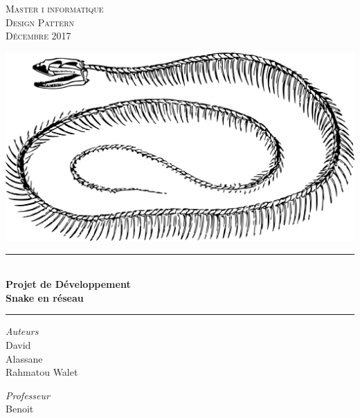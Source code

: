 \documentclass{report}
\begin{document}
\begin{titlepage}
	\centering
	
    \vspace*{1.2 cm}
    
   	\textsc{\LARGE Master i informatique\\Design Pattern\\[0.3cm]\large Décembre 2017}

	\vspace{2.2cm}
    
    
    \includegraphics[scale = 0.29]{img/snake.png}\\[0.5 cm]
	\rule{\linewidth }{0.2 mm} \\[0.15 cm]
    {\LARGE \textbf{Projet de Développement}\\[0.2cm] \large
		\textbf{Snake en réseau}}\\
	\rule{\linewidth}{0.2 mm}
       \vspace*{0.1 cm}
	
	\begin{center}
	\vspace{0.3cm}
	
	\emph{Auteurs}\\
	\vspace{0.1cm}
	David \\ 
	Alassane \\
	Rahmatou Walet 
		
	\vspace{0.5cm}
	\emph{Professeur}\\
	\vspace{0.1cm}
	Benoit 
	\end{center}		
	

\end{titlepage}
\end{document}
